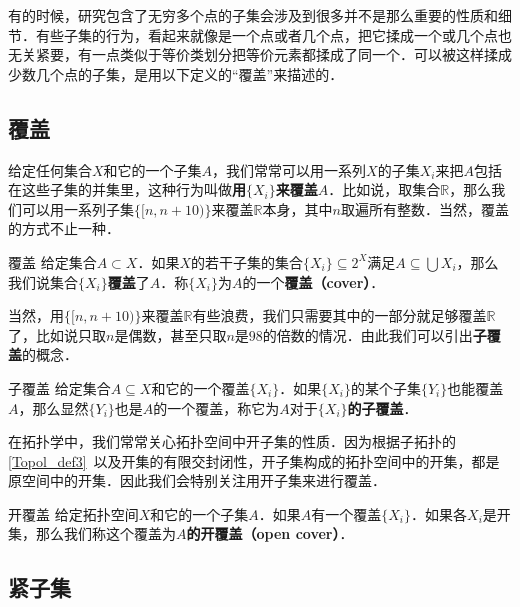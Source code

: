 

有的时候，研究包含了无穷多个点的子集会涉及到很多并不是那么重要的性质和细节．有些子集的行为，看起来就像是一个点或者几个点，把它揉成一个或几个点也无关紧要，有一点类似于等价类划分把等价元素都揉成了同一个．可以被这样揉成少数几个点的子集，是用以下定义的“覆盖”来描述的．

\subsection{覆盖}

给定任何集合$X$和它的一个子集$A$，我们常常可以用一系列$X$的子集$X_i$来把$A$包括在这些子集的并集里，这种行为叫做\textbf{用$\{X_i\}$来覆盖$A$}．比如说，取集合$\mathbb{R}$，那么我们可以用一系列子集$\{[n, n+10)\}$来覆盖$\mathbb{R}$本身，其中$n$取遍所有整数．当然，覆盖的方式不止一种．

\begin{definition}{覆盖}
给定集合$A\subset X$．如果$X$的若干子集的集合$\{X_i\}\subseteq 2^X$满足$A\subseteq\bigcup X_i$，那么我们说集合$\{X_i\}$\textbf{覆盖}了$A$．称$\{X_i\}$为$A$的一个\textbf{覆盖（cover）}．
\end{definition}

当然，用$\{[n, n+10)\}$来覆盖$\mathbb{R}$有些浪费，我们只需要其中的一部分就足够覆盖$\mathbb{R}$了，比如说只取$n$是偶数，甚至只取$n$是$98$的倍数的情况．由此我们可以引出\textbf{子覆盖}的概念．

\begin{definition}{子覆盖}
给定集合$A\subseteq X$和它的一个覆盖$\{X_i\}$．如果$\{X_i\}$的某个子集$\{Y_i\}$也能覆盖$A$，那么显然$\{Y_i\}$也是$A$的一个覆盖，称它为\textbf{$A对于\{X_i\}$的子覆盖}．
\end{definition}

在拓扑学中，我们常常关心拓扑空间中开子集的性质．因为根据子拓扑的\autoref{Topol_def3}~以及开集的有限交封闭性，开子集构成的拓扑空间中的开集，都是原空间中的开集．因此我们会特别关注用开子集来进行覆盖．

\begin{definition}{开覆盖}
给定拓扑空间$X$和它的一个子集$A$．如果$A$有一个覆盖$\{X_i\}$．如果各$X_i$是开集，那么我们称这个覆盖为\textbf{$A$的开覆盖（open cover）}．
\end{definition}

\subsection{紧子集}

